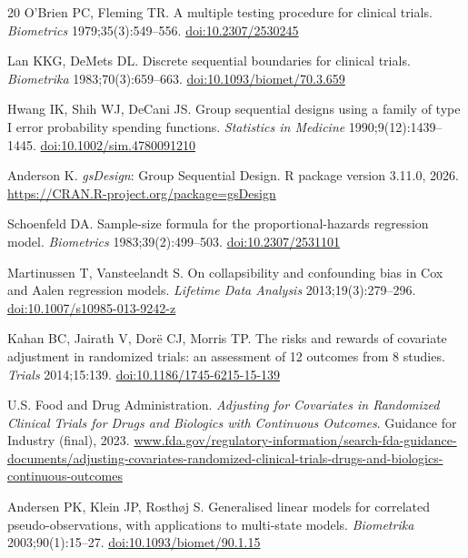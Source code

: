 \begin{thebibliography}{20}
O'Brien PC, Fleming TR.
A multiple testing procedure for clinical trials.
\emph{Biometrics} 1979;35(3):549--556. \href{https://doi.org/10.2307/2530245}{doi:10.2307/2530245}


Lan KKG, DeMets DL.
Discrete sequential boundaries for clinical trials.
\emph{Biometrika} 1983;70(3):659--663. \href{https://doi.org/10.1093/biomet/70.3.659}{doi:10.1093/biomet/70.3.659}


Hwang IK, Shih WJ, DeCani JS.
Group sequential designs using a family of type I error probability
spending functions.
\emph{Statistics in Medicine} 1990;9(12):1439--1445. \href{https://doi.org/10.1002/sim.4780091210}{doi:10.1002/sim.4780091210}


Anderson K.
\emph{gsDesign}: Group Sequential Design. R package version 3.11.0,
2026. \url{https://CRAN.R-project.org/package=gsDesign}

Schoenfeld DA.
Sample-size formula for the proportional-hazards regression model.
\emph{Biometrics} 1983;39(2):499--503. \href{https://doi.org/10.2307/2531101}{doi:10.2307/2531101}


Martinussen T, Vansteelandt S.
On collapsibility and confounding bias in Cox and Aalen regression
models.
\emph{Lifetime Data Analysis} 2013;19(3):279--296. \href{https://doi.org/10.1007/s10985-013-9242-z}{doi:10.1007/s10985-013-9242-z}


Kahan BC, Jairath V, Dor\"e CJ, Morris TP.
The risks and rewards of covariate adjustment in randomized trials:
an assessment of 12 outcomes from 8 studies.
\emph{Trials} 2014;15:139. \href{https://doi.org/10.1186/1745-6215-15-139}{doi:10.1186/1745-6215-15-139}


U.S. Food and Drug Administration.
\emph{Adjusting for Covariates in Randomized Clinical Trials for Drugs
and Biologics with Continuous Outcomes}. Guidance for Industry
(final), 2023. \href{https://www.fda.gov/regulatory-information/search-fda-guidance-documents/adjusting-covariates-randomized-clinical-trials-drugs-and-biologics-continuous-outcomes}{www.fda.gov/regulatory-information/search-fda-guidance-documents/adjusting-covariates-randomized-clinical-trials-drugs-and-biologics-continuous-outcomes}


Andersen PK, Klein JP, Rosth{\o}j S.
Generalised linear models for correlated pseudo-observations, with
applications to multi-state models.
\emph{Biometrika} 2003;90(1):15--27. \href{https://doi.org/10.1093/biomet/90.1.15}{doi:10.1093/biomet/90.1.15}


\end{thebibliography}
